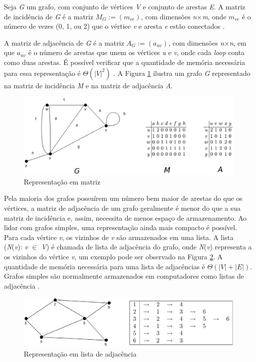 Seja \textit{G} um grafo, com conjunto de vértices \textit{V} e conjunto de arestas \textit{E}. A matriz de incidência de \textit{G} é a matriz $M_G:= (m_{ve})$, com dimensões \textit{n$\times$m}, onde $m_{ve}$ é o número de vezes (0, 1, ou 2) que o vértice \textit{v} e aresta \textit{e} estão conectados \cite{Bondy:2007}.

A matriz de adjacência de \textit{G} é a matriz $A_G := (a_{uv})$, com dimensões \textit{n$\times$n}, em que $a_{uv}$ é o número de arestas que unem os vértices \textit{u} e \textit{v}, onde cada \textit{loop} conta como duas arestas. É possível verificar que a quantidade de memória necessária para essa representação é $\Theta(|\textit{V}|^2)$ \cite{Bondy:2007}. A Figura \ref{matriz} ilustra um grafo \textit{G} representado na matriz de incidência \textit{M} e na matriz de adjacência \textit{A}.

\begin{figure}[!h]
	\centering
	\includegraphics[scale=0.6]{figuras/capitulo2/matriz.eps}
	\caption{Representação em matriz}
	\label{matriz}
\end{figure}

Pela maioria dos grafos possuírem um número bem maior de arestas do que os vértices, a matriz de adjacência de um grafo geralmente é menor do que a sua matriz de incidência e, assim, necessita de menos espaço de armazenamento. Ao lidar com grafos simples, uma representação ainda mais compacto é possível. Para cada vértice \textit{v}, os vizinhos de \textit{v} são armazenados em uma lista. A lista (\textit{N}(\textit{v}): \textit{v $\in$ V}) é chamada de lista de adjacência do grafo, onde \textit{N}(\textit{v}) representa a os vizinhos do vértice \textit{v}, um exemplo pode ser observado na Figura \ref{lista_adjacencia}. A quantidade de memória necessária para uma lista de adjacências é $\Theta(|\textit{V}| + |\textit{E}|)$. Grafos simples são normalmente armazenados em computadores como listas de adjacência \cite{Costa:2011}.

\begin{figure}[!h]
	\centering
	\includegraphics[scale=0.3]{figuras/capitulo2/lista_adjacencia.eps}
	\caption{Representação em lista de adjacência}
	\label{lista_adjacencia}
\end{figure}

